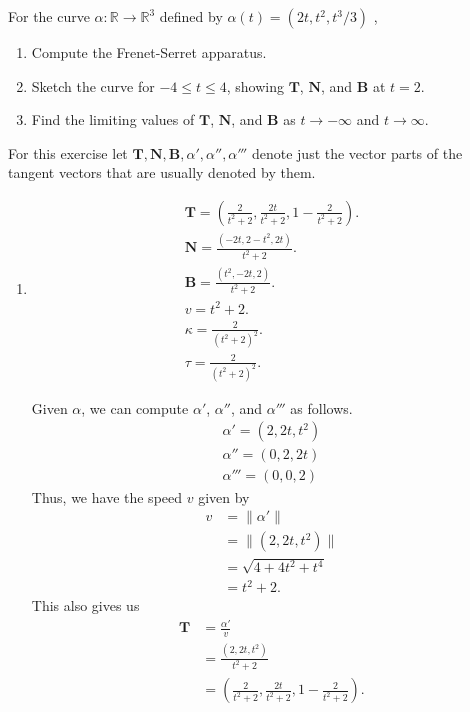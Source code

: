 \documentclass[12 pt, letterpaper]{hmcpset}
\begin{document}
\begin{problem}[Problem 1.]
	 For the curve $\alpha : \mathbb{R} \to \mathbb{R}^{3}$  defined by $\alpha(t) = (2t, t^{2}, t^{3}/3)$ ,
	\begin{enumerate}
		\item Compute the Frenet-Serret apparatus.
		\item Sketch the curve for $-4 \le t \le 4$, showing $\mathbf{T}$, $\mathbf{N}$, and $\mathbf{B}$ at $t = 2$.
		\item Find the limiting values of $\mathbf{T}$, $\mathbf{N}$, and $\mathbf{B}$ as $t \to - \infty$ and $t \to \infty$.
	\end{enumerate} 
\end{problem}

\begin{solution}
	For this exercise let $\mathbf{T}, \mathbf{N}, \mathbf{B}, \alpha', \alpha'', \alpha'''$ denote just the vector parts of the tangent vectors that are usually denoted by them.
	\begin{enumerate}
		\item
			\[
				\boxed{
					\begin{gathered}
						\mathbf{T} = \left ( \frac{2}{t^{2} + 2}, \frac{2t}{t^{2} + 2}, 1 - \frac{2}{t^{2} + 2} \right ). \\
						\mathbf{N} = \frac{(-2t, 2 - t^{2}, 2t)}{t^{2} + 2}. \\
						\mathbf{B} = \frac{(t^{2}, -2t, 2)}{t^{2} + 2}. \\
						v = t^{2} + 2. \\
						\kappa = \frac{2}{(t^{2} + 2)^{2}}. \\
						\tau = \frac{2}{(t^{2} + 2)^{2}}.
					\end{gathered}
				}
			\] 

			Given $\alpha$, we can compute $\alpha'$, $\alpha''$, and $\alpha'''$ as follows.
			\[
				\begin{gathered}
					\alpha' = (2, 2t, t^{2}) \\
					\alpha'' = (0, 2, 2t) \\
					\alpha''' = (0, 0, 2)
				\end{gathered}
			\]
			Thus, we have the speed $v$ given by
			\[
				\begin{split}
					v & = \lVert \alpha' \rVert \\
					  & = \lVert (2, 2t, t^{2}) \rVert \\
					  & = \sqrt{4 + 4t^{2} + t^{4}} \\
					  & = t^{2} + 2.
				\end{split}
			\]
			This also gives us
			\[
				\begin{split}
					\mathbf{T} & = \frac{\alpha'}{v} \\
						   & = \frac{(2, 2t, t^{2})}{t^{2} + 2} \\
						   & = \left ( \frac{2}{t^{2} + 2}, \frac{2t}{t^{2} + 2}, 1 - \frac{2}{t^{2} + 2} \right ).
				\end{split}
			\] 


\end{enumerate}
\end{solution}
\end{document}
